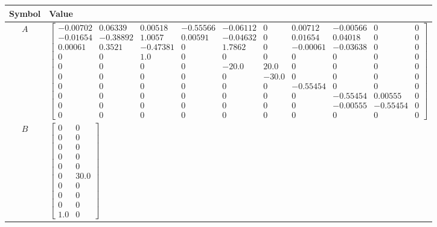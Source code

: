 \begin{tabular}{cl}
\hline
  Symbol  & Value                                                                                                                                                                                                                                                                                                                                                                                                                                                                                                                                                                                                                       \\
\hline
   $A$    & $\left[\begin{matrix}-0.00702 & 0.06339 & 0.00518 & -0.55566 & -0.06112 & 0 & 0.00712 & -0.00566 & 0 & 0\\-0.01654 & -0.38892 & 1.0057 & 0.00591 & -0.04632 & 0 & 0.01654 & 0.04018 & 0 & 0\\0.00061 & 0.3521 & -0.47381 & 0 & 1.7862 & 0 & -0.00061 & -0.03638 & 0 & 0\\0 & 0 & 1.0 & 0 & 0 & 0 & 0 & 0 & 0 & 0\\0 & 0 & 0 & 0 & -20.0 & 20.0 & 0 & 0 & 0 & 0\\0 & 0 & 0 & 0 & 0 & -30.0 & 0 & 0 & 0 & 0\\0 & 0 & 0 & 0 & 0 & 0 & -0.55454 & 0 & 0 & 0\\0 & 0 & 0 & 0 & 0 & 0 & 0 & -0.55454 & 0.00555 & 0\\0 & 0 & 0 & 0 & 0 & 0 & 0 & -0.00555 & -0.55454 & 0\\0 & 0 & 0 & 0 & 0 & 0 & 0 & 0 & 0 & 0\end{matrix}\right]$ \\
   $B$    & $\left[\begin{matrix}0 & 0\\0 & 0\\0 & 0\\0 & 0\\0 & 0\\0 & 30.0\\0 & 0\\0 & 0\\0 & 0\\1.0 & 0\end{matrix}\right]$                                                                                                                                                                                                                                                                                                                                                                                                                                                                                                          \\

\end{tabular}

